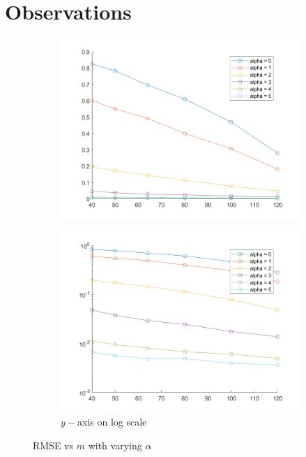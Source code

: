 \documentclass[a4paper]{article}
\begin{document}
\section{Observations}
\begin{figure}[H]
	\centering
	\begin{subfigure}{0.45\linewidth}
		\centering
		\includegraphics[width=\linewidth]{../media/Q5 RMSEs.png}
		\caption{}
	\end{subfigure}
	\begin{subfigure}{0.45\linewidth}
		\centering
		\includegraphics[width=\linewidth]{../media/Q5 RMSEs log Y-axis.png}
		\caption{$y-$axis on log scale}
	\end{subfigure}
	\caption{RMSE vs $m$ with varying $\alpha$}
\end{figure}
\end{document}
